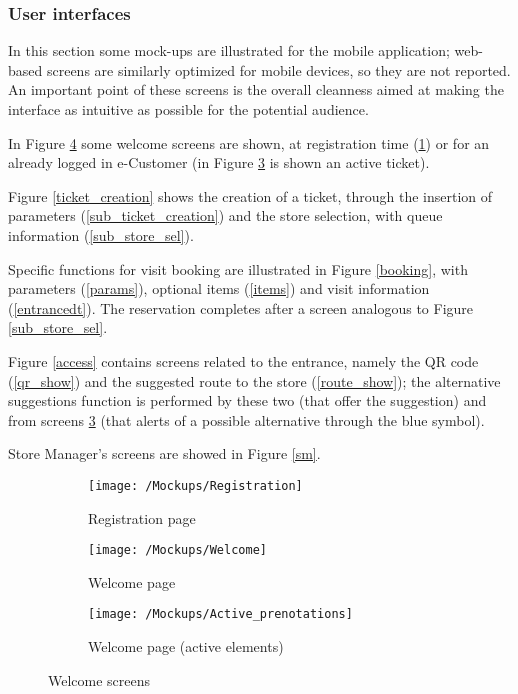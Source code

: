 
\subsubsection{User interfaces}
In this section some mock-ups are illustrated for the mobile application; web-based screens are similarly optimized for mobile devices, so they are not reported. An important point of these screens is the overall cleanness aimed at making the interface as intuitive as possible for the potential audience. 

In Figure \ref{welcome} some welcome screens are shown, at registration time (\ref{sub_reg}) or for an already logged in e-Customer (in Figure \ref{sub_active} is shown an active ticket).

Figure \ref{ticket_creation} shows the creation of a ticket, through the insertion of parameters (\ref{sub_ticket_creation}) and the store selection, with queue information (\ref{sub_store_sel}).

Specific functions for visit booking are illustrated in Figure \ref{booking}, with parameters (\ref{params}), optional items (\ref{items}) and visit information (\ref{entrancedt}). The reservation completes after a screen analogous to Figure \ref{sub_store_sel}.

Figure \ref{access} contains screens related to the entrance, namely the QR code (\ref{qr_show}) and the suggested route to the store (\ref{route_show}); the alternative suggestions function is performed by these two (that offer the suggestion) and from screens \ref{sub_active} (that alerts of a possible alternative through the blue symbol).

Store Manager's screens are showed in Figure \ref{sm}.

\begin{figure}[h]
	\begin{subfigure}{.33\textwidth}
		\centering
		\texttt{[image: /Mockups/Registration]}
		\caption{Registration page}
		\label{sub_reg}
	\end{subfigure}
	\begin{subfigure}{.33\textwidth}
		\centering
		\texttt{[image: /Mockups/Welcome]}
		\caption{Welcome page}
		\label{sub_welcome}
	\end{subfigure}
	\begin{subfigure}{.33\textwidth}
		\centering
		\texttt{[image: /Mockups/Active\_prenotations]}
		\caption{Welcome page (active elements)}
		\label{sub_active}
	\end{subfigure}
	\caption{Welcome screens}
	\label{welcome}
\end{figure}

